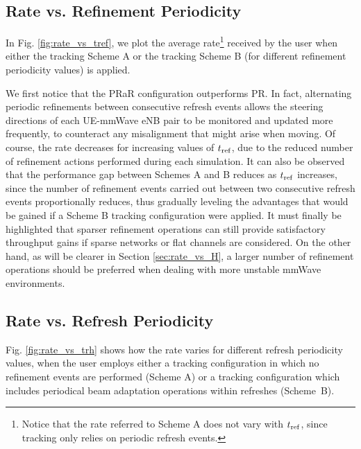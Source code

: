 \documentclass[conference]{IEEEtran}
\begin{document}
\subsection{Rate vs. Refinement Periodicity}
\label{sec:rate_vs_tref}

In Fig. \ref{fig:rate_vs_tref}, we plot the average rate\footnote{\label{footnoteSameRate}Notice that the rate referred to Scheme A does not vary with $t_{\rm ref}$, since tracking only relies on periodic refresh events.}  received by the user when either the tracking  Scheme A or the tracking Scheme B (for different refinement periodicity values) is applied.

We first notice that the PRaR configuration outperforms  PR. 
In fact, alternating periodic refinements between consecutive refresh events allows the steering directions of each  UE-mmWave eNB pair to be monitored and  updated more frequently, to counteract any misalignment  that might arise when moving.
Of course, the rate decreases for increasing values of $t_{\rm ref}$, due to the reduced number of refinement actions performed during each simulation.
It can also be observed that the performance gap between Schemes A and B reduces as $t_{\rm ref}$ increases, since the number of refinement events carried out between two consecutive refresh events proportionally reduces, thus gradually leveling the advantages that would be gained if a Scheme B tracking configuration were applied.
It must finally be highlighted that sparser refinement operations can still provide satisfactory throughput gains if sparse networks or flat channels are considered. On the other hand, as  will be clearer in Section  \ref{sec:rate_vs_H}, a larger number of refinement operations should be preferred when dealing with more unstable mmWave environments.



\subsection{Rate vs. Refresh Periodicity}

Fig. \ref{fig:rate_vs_trh} shows how the rate varies for different refresh periodicity values, when the user employs either a tracking configuration in which no refinement events are performed (Scheme A) or  a tracking configuration which includes periodical beam adaptation operations within refreshes (Scheme~B).
\end{document}
